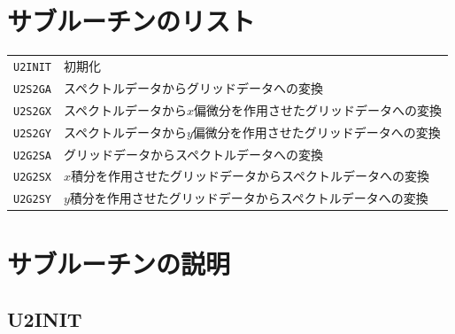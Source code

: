 \documentclass[a4j,fleqn]{jarticle}
\begin{document}

\section{サブルーチンのリスト}

\vspace{1em}
\begin{tabular}{ll}
{\tt U2INIT} & 初期化\\
{\tt U2S2GA} & スペクトルデータからグリッドデータへの変換\\
{\tt U2S2GX} & スペクトルデータから$x$偏微分を作用させたグリッドデータへの変換\\
{\tt U2S2GY} & スペクトルデータから$y$偏微分を作用させたグリッドデータへの変換\\
{\tt U2G2SA} & グリッドデータからスペクトルデータへの変換\\
{\tt U2G2SX} & $x$積分を作用させたグリッドデータからスペクトルデータへの変換\\
{\tt U2G2SY} & $y$積分を作用させたグリッドデータからスペクトルデータへの変換
\end{tabular}


\section{サブルーチンの説明}

\subsection{U2INIT}
\end{document}
